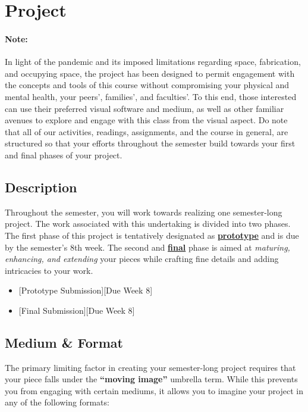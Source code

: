 \hypertarget{longproject}{\section{Project}}


\paragraph{Note:} In light of the pandemic and its imposed limitations regarding space, fabrication, and occupying space, the project has been designed to permit engagement with the concepts and tools of this course without compromising your physical and mental health, your peers', families', and faculties'. To this end, those interested can use their preferred visual software and medium, as well as other familiar avenues to explore and engage with this class from the visual aspect. Do note that all of our activities, readings, assignments, and the course in general, are structured so that your efforts throughout the semester build towards your first and final phases of your project.

\subsection{Description}

Throughout the semester, you will work towards realizing one semester-long project. The work associated with this undertaking is divided into two phases. The first phase of this project is tentatively designated as \ul{\textbf{prototype}} and is due by the semester's 8th week. The second and \ul{\textbf{final}} phase is aimed at \emph{maturing, enhancing, and extending} your pieces while crafting fine details and adding intricacies to your work.

\begin{itemize}
    \tightlist
    \item {}[Prototype Submission][Due Week 8]
    \item {}[Final Submission][Due Week 8]
\end{itemize}

\hypertarget{projformat}{\subsection{Medium \& Format}}

The primary limiting factor in creating your semester-long project requires that your piece falls under the \textbf{``moving image''} umbrella term. While this prevents you from engaging with certain mediums, it allows you to imagine your project in any of the following formats:

